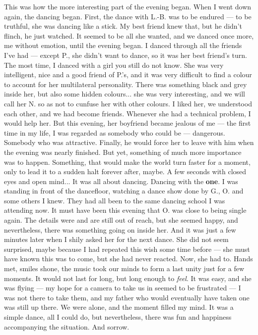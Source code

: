 This was how the more interesting part of the evening began. When I went down again, the dancing began. First, the dance with L.-B. was to be endured --- to be truthful, she was dancing like a stick. My best friend knew that, but he didn't flinch, he just watched. It seemed to be all she wanted, and we danced once more, me without emotion, until the evening began. I danced through all the friends I've had --- except P., she didn't want to dance, so it was her best friend's turn. 
The most time, I danced with a girl you still do not know. She was very intelligent, nice and a good friend of P.'s, and it was very difficult to find a colour to account for her multilateral personality. There was something black and grey inside her, but also some hidden colours... she was very interesting, and we will call her N. so as not to cunfuse her with other colours. 
I liked her, we understood each other, and we had become friends. Whenever she had a technical problem, I would help her. But this evening, her boyfriend became jealous of me ---  the first time in my life, I was regarded as somebody who could be --- dangerous. Somebody who was attractive. Finally, he would force her to leave with him when the evening was nearly finished. 
But yet, something of much more importance was to happen. Something, that would make the world turn faster for a moment, only to lead it to a sudden halt forever after, maybe. A few seconds with closed eyes and open mind... 
It was all about dancing. Dancing with the \textbf{one}. I was standing in front of the dancefloor, watching a dance show done by G., O. and some others I knew. They had all been to the same dancing school I was attending now. 
It must have been this evening that O. was close to being single again. The details were and are still out of reach, but she seemed happy, and nevertheless, there was something going on inside her. 
And it was just a few minutes later when I shily asked her for the next dance. She did not seem surprised, maybe because I had repeated this wish some time before --- she must have known this was to come, but she had never reacted. Now, she had to. 
Hands met, smiles shone, the music took our minds to form a last unity just for a few moments. It would not last for long, but long enough to \emph{feel}. 
It was easy, and she was flying --- my hope for a camera to take us in seemed to be frustrated --- I was not there to take them, and my father who would eventually have taken one was still up there. We were alone, and the moment filled my mind. It was a simple dance, all I could do, but nevertheless, there was fun and happiness accompanying the situation. And sorrow. 
